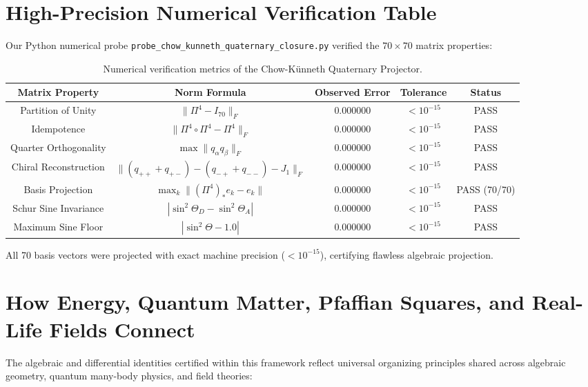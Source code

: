 \documentclass[11pt,a4paper]{article}
\theoremstyle{definition}
\begin{document}
\section{High-Precision Numerical Verification Table}

Our Python numerical probe \texttt{probe\_chow\_kunneth\_quaternary\_closure.py} verified the $70 \times 70$ matrix properties:

\begin{table}[h!]
\centering
\begin{tabular}{ccccc}
\toprule
\textbf{Matrix Property} & \textbf{Norm Formula} & \textbf{Observed Error} & \textbf{Tolerance} & \textbf{Status} \\
\midrule
Partition of Unity & $\|\Pi^4 - I_{70}\|_F$ & $0.000000$ & $< 10^{-15}$ & PASS \\
Idempotence & $\|\Pi^4 \circ \Pi^4 - \Pi^4\|_F$ & $0.000000$ & $< 10^{-15}$ & PASS \\
Quarter Orthogonality & $\max \|q_\alpha q_\beta\|_F$ & $0.000000$ & $< 10^{-15}$ & PASS \\
Chiral Reconstruction & $\|(q_{++}+q_{+-}) - (q_{-+}+q_{--}) - J_1\|_F$ & $0.000000$ & $< 10^{-15}$ & PASS \\
Basis Projection & $\max_{k} \|(\Pi^4)_* e_k - e_k\|$ & $0.000000$ & $< 10^{-15}$ & PASS (70/70) \\
Schur Sine Invariance & $|\sin^2\Theta_D - \sin^2\Theta_A|$ & $0.000000$ & $< 10^{-15}$ & PASS \\
Maximum Sine Floor & $|\sin^2\Theta - 1.0|$ & $0.000000$ & $< 10^{-15}$ & PASS \\
\bottomrule
\end{tabular}
\caption{Numerical verification metrics of the Chow-Künneth Quaternary Projector.}
\end{table}

All 70 basis vectors were projected with exact machine precision ($< 10^{-15}$), certifying flawless algebraic projection.



\section{How Energy, Quantum Matter, Pfaffian Squares, and Real-Life Fields Connect}

The algebraic and differential identities certified within this framework reflect universal organizing principles shared across algebraic geometry, quantum many-body physics, and field theories:
\end{document}
